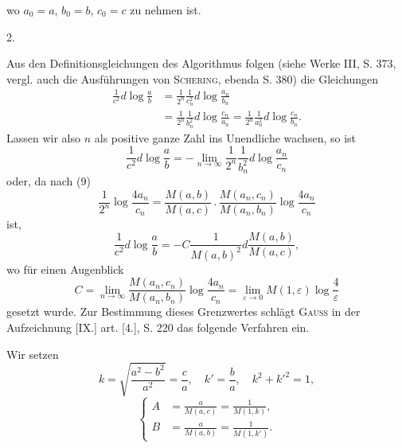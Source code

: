 \noindent wo $a_0=a$, $b_0=b$, $c_0=c$ zu nehmen ist.
\begin{center}2.\end{center}
\par\indent Aus den Definitionsgleichungen des Algorithmus folgen (siehe Werke III, S. 373, vergl. auch die Ausführungen von \textsc{Schering}, ebenda S. 380) die Gleichungen
\begin{equation*}\tag*{(11)}
\begin{aligned}
\frac{1}{c^2}d\log\frac ab&=\frac1{2^n}\frac1{c_n^2}d\log\frac{a_n}{b_n}\\
&=\frac1{2^n}\frac1{b_n^2}d\log\frac{c_n}{a_n}=\frac1{2^n}\frac1{a_n^2}d\log\frac{c_n}{b_n}.
\end{aligned}
\end{equation*}
\noindent Lassen wir also $n$ als positive ganze Zahl ins Unendliche wachsen, so ist
\[\frac1{c^2}d\log\frac ab=-\lim_{n\to\infty}\frac1{2^n}\frac1{b_n^2}d\log\frac{a_n}{c_n}\]
\noindent oder, da nach (9)
\begin{equation*}\tag*{(12)}\frac1{2^n}\log\frac{4a_n}{c_n}=\frac{M(a,b)}{M(a,c)}\, .\,\frac{M(a_n,c_n)}{M(a_n,b_n)}\log\frac{4a_n}{c_n}\end{equation*}
\noindent ist,
\begin{equation*}\tag*{(13)}\frac1{c^2}d\log\frac ab=-C\frac1{M(a,b)^2}d\frac{M(a,b)}{M(a,c)},\end{equation*}
\noindent wo für einen Augenblick
\begin{equation*}\tag*{(14)}C=\lim_{n\to\infty}\frac{M(a_n,c_n)}{M(a_n,b_n)}\log\frac{4a_n}{c_n}=\lim_{\varepsilon\to0}M(1,\varepsilon)\log\frac4\varepsilon\end{equation*}
\noindent gesetzt wurde. Zur Bestimmung dieses Grenzwertes schlägt \textsc{Gauss} in der Aufzeichnung [IX.] art. [4.], S. 220 das folgende Verfahren ein.
\clearpage
{}
\par\indent Wir setzen
\begin{equation*}\tag*{(15)}k=\sqrt{\frac{a^2-b^2}{a^2}}=\frac ca,\quad k'=\frac ba,\quad k^2+k'^2=1,\end{equation*}
\begin{equation*}\tag*{(16)}
\left\{\begin{aligned}
A&=\frac a{M(a,c)}=\frac1{M(1,k)},\\[4pt]
B&=\frac a{M(a,b)}=\frac1{M(1,k')}.
\end{aligned}\right.
\end{equation*}

